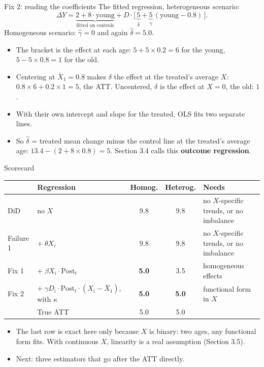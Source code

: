 \documentclass[
  11pt,
  ignorenonframetext,
  aspectratio=169,
]{beamer}
\providecommand{\tightlist}{%
  \setlength{\itemsep}{0pt}\setlength{\parskip}{0pt}}
\begin{document}
\begin{frame}{Fix 2: reading the coefficients}
\protect{}\label{fix-2-reading-the-coefficients}
The fitted regression, heterogeneous scenario: \[
\Delta Y = \underbrace{2 + 8 \cdot \text{young}}_{\text{fitted on controls}} + D \cdot \big[\,\underbrace{5}_{\hat\delta} + \underbrace{5}_{\hat\gamma}\,(\text{young} - 0.8)\,\big] .
\] Homogeneous scenario: \(\hat\gamma = 0\) and again
\(\hat\delta = 5.0\).

\begin{itemize}
\tightlist
\item
  The bracket is the effect at each age: \(5 + 5 \times 0.2 = 6\) for
  the young, \(5 - 5 \times 0.8 = 1\) for the old.
\item
  Centering at \(\bar X_1 = 0.8\) makes \(\delta\) the effect at the
  treated's average \(X\): \(0.8 \times 6 + 0.2 \times 1 = 5\), the ATT.
  Uncentered, \(\delta\) is the effect at \(X = 0\), the old: \(1\).
\item
  With their own intercept and slope for the treated, OLS fits two
  separate lines.
\item
  So \(\hat\delta\) = treated mean change minus the control line at the
  treated's average age: \(13.4 - (2 + 8 \times 0.8) = 5\). Section 3.4
  calls this \textbf{outcome regression}.
\end{itemize}
\end{frame}

\begin{frame}{Scorecard}
\protect{}\label{scorecard}
\begin{center}\small
\begin{tabular}{llcc>{\raggedright\arraybackslash}p{3.4cm}}
\toprule
 & Regression & Homog. & Heterog. & Needs \\
\midrule
DiD & no $X$ & 9.8 & 9.8 & no $X$-specific trends, or no imbalance \\
Failure 1 & $+\;\theta X_i$ & 9.8 & 9.8 & no $X$-specific trends, or no imbalance \\
Fix 1 & $+\;\beta X_i \cdot \text{Post}_t$ & \textbf{5.0} & 3.5 & homogeneous effects \\
Fix 2 & $+\;\gamma D_i \cdot \text{Post}_t \cdot (X_i - \bar X_1)$, with $\kappa$ & \textbf{5.0} & \textbf{5.0} & functional form in $X$ \\
\midrule
 & True ATT & 5.0 & 5.0 & \\
\bottomrule
\end{tabular}
\end{center}

\begin{itemize}
\tightlist
\item
  The last row is exact here only because \(X\) is binary: two ages, any
  functional form fits. With continuous \(X\), linearity is a real
  assumption (Section 3.5).
\item
  Next: three estimators that go after the ATT directly.
\end{itemize}
\end{frame}
\end{document}
